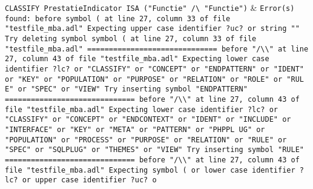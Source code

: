 \texttt{CLASSIFY PrestatieIndicator ISA ("Functie" /\textbackslash{} "Functie")} & \texttt{Error(s) found:\newline
  \newline
  before symbol ( at line 27, column 33 of file "testfile\_mba.adl"\newline
  Expecting upper case identifier ?uc? or string ""\newline
  Try deleting symbol symbol ( at line 27, column 33 of file "testfile\_mba.adl"\newline
  \newline
  ==============================\newline
  \newline
  before "/\textbackslash{}\textbackslash{}" at line 27, column 43 of file "testfile\_mba.adl"\newline
  Expecting lower case identifier ?lc? or "CLASSIFY" or "CONCEPT" or "ENDPATTERN"\newline
  or "IDENT" or "KEY" or "POPULATION" or "PURPOSE" or "RELATION" or "ROLE" or "RUL\newline
  E" or "SPEC" or "VIEW"\newline
  Try inserting symbol "ENDPATTERN"\newline
  \newline
  ==============================\newline
  \newline
  before "/\textbackslash{}\textbackslash{}" at line 27, column 43 of file "testfile\_mba.adl"\newline
  Expecting lower case identifier ?lc? or "CLASSIFY" or "CONCEPT" or "ENDCONTEXT"\newline
  or "IDENT" or "INCLUDE" or "INTERFACE" or "KEY" or "META" or "PATTERN" or "PHPPL\newline
  UG" or "POPULATION" or "PROCESS" or "PURPOSE" or "RELATION" or "RULE" or "SPEC"\newline
  or "SQLPLUG" or "THEMES" or "VIEW"\newline
  Try inserting symbol "RULE"\newline
  \newline
  ==============================\newline
  \newline
  before "/\textbackslash{}\textbackslash{}" at line 27, column 43 of file "testfile\_mba.adl"\newline
  Expecting symbol ( or lower case identifier ?lc? or upper case identifier ?uc? o\newline
}
